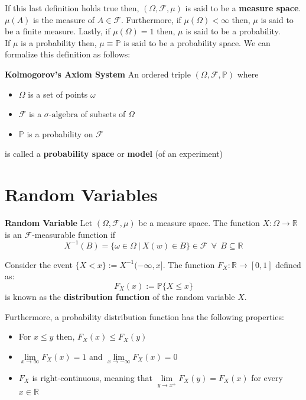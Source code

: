 \documentclass[11pt]{report}
\newcommand{\salg}{\sigma\text{-algebra}}
\begin{document}
If this last definition holds true then, $(\Omega, \mathscr{F}, \mu)$ is said to be a \textbf{measure space}. $\mu(A)$ is the measure of $A\in\mathscr{F}$. Furthermore, if $\mu(\Omega) < \infty$ then, $\mu$ is said to be a finite measure. Lastly, if  $\mu(\Omega) = 1$ then, $\mu$ is said to be a probability.\\

If $\mu$ is a probability then, $\mu \equiv \mathbb{P}$ is said to be a probability space. We can formalize this definition as follows:

\begin{definition}{\textbf{Kolmogorov's Axiom System}}
	An ordered triple $(\Omega, \mathscr{F}, \mathbb{P})$ where
	\begin{itemize}
		\item $\Omega$ is a set of points $\omega$
		\item $\mathscr{F}$ is a $\salg$ of subsets of $\Omega$
		\item $\mathbb P$ is a probability on $\mathscr{F}$
	\end{itemize}
	is called a \textbf{probability space} or \textbf{model} (of an experiment)
\end{definition}

\section{Random Variables}
\begin{definition}{\textbf{Random Variable}}\label{rvar}
	Let $(\Omega, \mathscr{F}, \mu)$ be a measure space. The function $X: \Omega \rightarrow \mathbb{R}$ is an $\mathscr{F}$-measurable function if
	\begin{equation}
		X^{-1}(B) = \{\omega \in \Omega \ | \ X(w) \in B\} \in \mathscr{F} \ \ \forall \ \ B \subseteq \mathbb{R}
	\end{equation}
\end{definition}

\begin{definition}\label{dist_func}
	Consider the event $\{X < x\} := X^{-1}(-\infty, x]$. The function $F_X: \mathbb{R} \rightarrow [0, 1]$ defined as:
	\begin{equation}
		F_X(x) := \mathbb{P}\{X \leq x\}
	\end{equation}
	is known as the \textbf{distribution function} of the random variable $X$.
\end{definition}

Furthermore, a probability distribution function has the following properties:
\begin{itemize}
	\item For $x \leq y$ then, $F_X(x) \leq F_X(y)$
	\item $\lim\limits_{x\to\infty} F_X(x) = 1$ and $\lim\limits_{x\to - \infty} F_X(x) = 0$
	\item $F_X$ is right-continuous, meaning that $\lim\limits_{y\to x^+} F_X(y) = F_X(x)$ for every $x \in \mathbb{R}$
\end{itemize}
\end{document}
